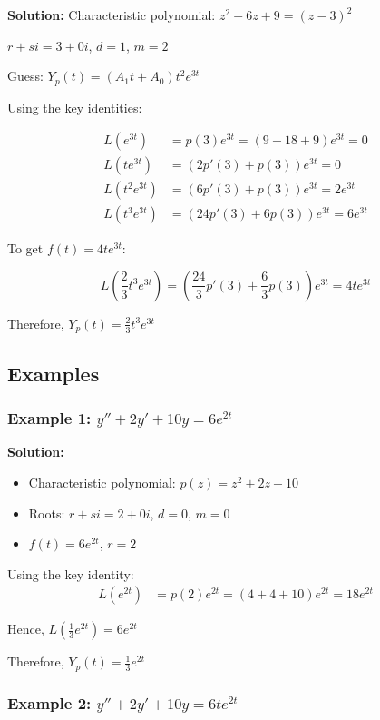 \documentclass{article}
\begin{document}
\textbf{Solution:} 
Characteristic polynomial: $z^2-6z+9 = (z-3)^2$

$r + si = 3 + 0i$, $d = 1$, $m = 2$

Guess: $Y_p(t) = (A_1t + A_0)t^2e^{3t}$

Using the key identities:

\begin{align*}
L(e^{3t}) &= p(3)e^{3t} = (9-18+9)e^{3t} = 0 \\
L(te^{3t}) &= (2p'(3)+p(3))e^{3t} = 0 \\
L(t^2e^{3t}) &= (6p'(3)+p(3))e^{3t} = 2e^{3t} \\
L(t^3e^{3t}) &= (24p'(3)+6p(3))e^{3t} = 6e^{3t}
\end{align*}

To get $f(t) = 4te^{3t}$:

\[L(\frac{2}{3}t^3e^{3t}) = (\frac{24}{3}p'(3)+\frac{6}{3}p(3))e^{3t} = 4te^{3t}\]

Therefore, $Y_p(t) = \frac{2}{3}t^3e^{3t}$

\subsection*{Examples}

\subsubsection*{Example 1: $y''+2y'+10y = 6e^{2t}$}

\textbf{Solution:} 
\begin{itemize}
    \item Characteristic polynomial: $p(z) = z^2+2z+10$
    \item Roots: $r+si = 2+0i$, $d = 0$, $m = 0$
    \item $f(t) = 6e^{2t}$, $r = 2$
\end{itemize}

Using the key identity:
\begin{align*}
L(e^{2t}) &= p(2)e^{2t} = (4+4+10)e^{2t} = 18e^{2t}
\end{align*}

Hence, $L(\frac{1}{3}e^{2t}) = 6e^{2t}$

Therefore, $Y_p(t) = \frac{1}{3}e^{2t}$

\subsubsection*{Example 2: $y''+2y'+10y = 6te^{2t}$}
\end{document}
